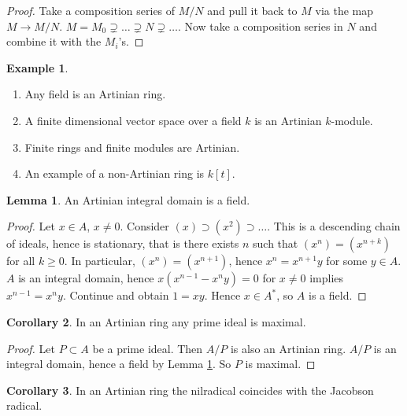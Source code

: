 \documentclass{article}
\newcommand{\rb}[1]{\left( #1 \right)}
\renewcommand{\sb}[1]{\left[ #1 \right]}
\theoremstyle{definition}\newtheorem{definition}{Definition}[section]
\theoremstyle{definition}\newtheorem{remark}[definition]{Remark}
\theoremstyle{definition}\newtheorem*{example}{Example}
\theoremstyle{definition}\newtheorem*{note}{Note}
\newtheorem{lemma}[definition]{Lemma}
\newtheorem{corollary}[definition]{Corollary}
\begin{document}
\begin{proof}
Take a composition series of $ M / N $ and pull it back to $ M $ via the map $ M \to M / N $. $ M = M_0 \supsetneq \dots \supsetneq N \supsetneq \dots $. Now take a composition series in $ N $ and combine it with the $ M_i $'s.
\end{proof}


\begin{example}
\hfill
\begin{enumerate}
\item Any field is an Artinian ring.
\item A finite dimensional vector space over a field $ k $ is an Artinian $ k $-module.
\item Finite rings and finite modules are Artinian.
\item An example of a non-Artinian ring is $ k\sb{t} $.
\end{enumerate}
\end{example}

\begin{lemma}
\label{lem:12.6}
An Artinian integral domain is a field.
\end{lemma}

\begin{proof}
Let $ x \in A $, $ x \ne 0 $. Consider $ \rb{x} \supset \rb{x^2} \supset \dots $. This is a descending chain of ideals, hence is stationary, that is there exists $ n $ such that $ \rb{x^n} = \rb{x^{n + k}} $ for all $ k \ge 0 $. In particular, $ \rb{x^n} = \rb{x^{n + 1}} $, hence $ x^n = x^{n + 1}y $ for some $ y \in A $. $ A $ is an integral domain, hence $ x\rb{x^{n - 1} - x^ny} = 0 $ for $ x \ne 0 $ implies $ x^{n - 1} = x^ny $. Continue and obtain $ 1 = xy $. Hence $ x \in A^* $, so $ A $ is a field.
\end{proof}

\begin{corollary}
In an Artinian ring any prime ideal is maximal.
\end{corollary}

\begin{proof}
Let $ P \subset A $ be a prime ideal. Then $ A / P $ is also an Artinian ring. $ A / P $ is an integral domain, hence a field by Lemma \ref{lem:12.6}. So $ P $ is maximal.
\end{proof}

\begin{corollary}
In an Artinian ring the nilradical coincides with the Jacobson radical.
\end{corollary}
\end{document}
